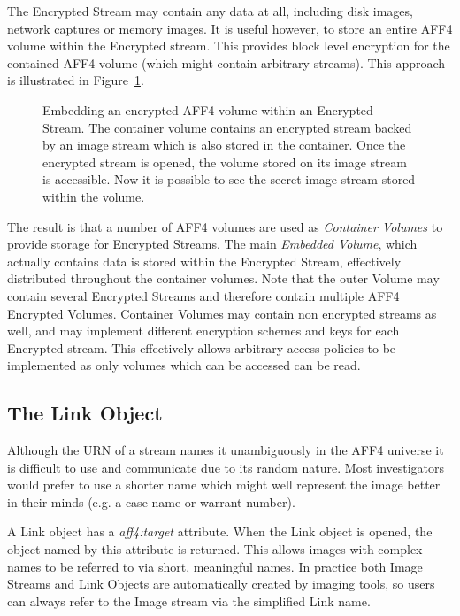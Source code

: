 \documentclass[10pt, conference]{IEEEtran}
\begin{document}
The Encrypted Stream may contain any data at all, including disk
images, network captures or memory images. It is useful however, to
store an entire AFF4 volume within the Encrypted stream. This provides
block level encryption for the contained AFF4 volume (which might
contain arbitrary streams). This approach is illustrated in
Figure~\ref{crypted_fif}.

\begin{figure}[tb]
  \begin{center}
  \mbox{\columnwidth {}}

  \caption{Embedding an encrypted AFF4 volume within an Encrypted
  Stream. The container volume contains an encrypted stream backed by
  an image stream which is also stored in the container. Once the
  encrypted stream is opened, the volume stored on its image stream is
  accessible. Now it is possible to see the secret image stream stored
  within the volume.}

  \label{crypted_fif}
  \end{center}
\end{figure}

The result is that a number of AFF4 volumes are used as {\em Container
Volumes} to provide storage for Encrypted Streams. The main {\em
Embedded Volume}, which actually contains data is stored within the
Encrypted Stream, effectively distributed throughout the container
volumes. Note that the outer Volume may contain several Encrypted
Streams and therefore contain multiple AFF4 Encrypted
Volumes. Container Volumes may contain non encrypted streams as well,
and may implement different encryption schemes and keys for each
Encrypted stream. This effectively allows arbitrary access policies to
be implemented as only volumes which can be accessed can be read.

\subsection{The Link Object}
Although the URN of a stream names it unambiguously in the AFF4
universe it is difficult to use and communicate due to its random
nature. Most investigators would prefer to use a shorter name which
might well represent the image better in their minds (e.g. a case
name or warrant number).

A Link object has a \emph{aff4:target} attribute. When the Link object
is opened, the object named by this attribute is returned. This allows
images with complex names to be referred to via short, meaningful
names. In practice both Image Streams and Link Objects are
automatically created by imaging tools, so users can always refer to
the Image stream via the simplified Link name.
\end{document}
